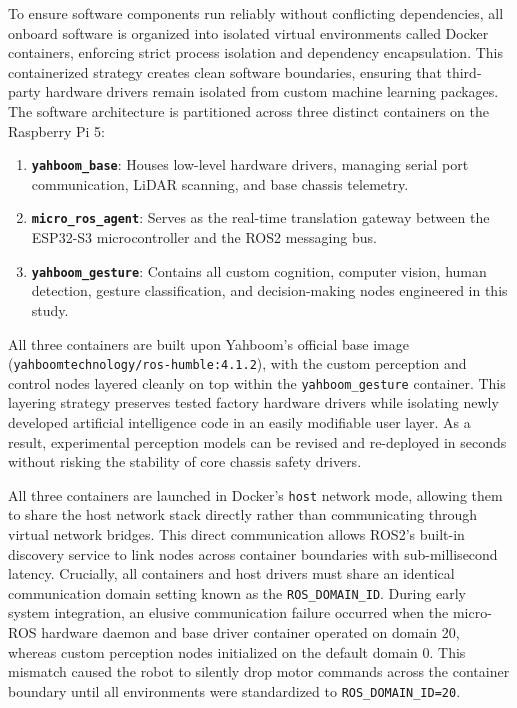 To ensure software components run reliably without conflicting dependencies, all onboard software is organized into isolated virtual environments called Docker containers, enforcing strict process isolation and dependency encapsulation. This containerized strategy creates clean software boundaries, ensuring that third-party hardware drivers remain isolated from custom machine learning packages. The software architecture is partitioned across three distinct containers on the Raspberry Pi 5:
\begin{enumerate}
    \item \textbf{\texttt{yahboom\_base}}: Houses low-level hardware drivers, managing serial port communication, LiDAR scanning, and base chassis telemetry.
    \item \textbf{\texttt{micro\_ros\_agent}}: Serves as the real-time translation gateway between the ESP32-S3 microcontroller and the ROS2 messaging bus.
    \item \textbf{\texttt{yahboom\_gesture}}: Contains all custom cognition, computer vision, human detection, gesture classification, and decision-making nodes engineered in this study.
\end{enumerate}

All three containers are built upon Yahboom's official base image (\texttt{yahboomtechnology/ros-humble:4.1.2}), with the custom perception and control nodes layered cleanly on top within the \texttt{yahboom\_gesture} container. This layering strategy preserves tested factory hardware drivers while isolating newly developed artificial intelligence code in an easily modifiable user layer. As a result, experimental perception models can be revised and re-deployed in seconds without risking the stability of core chassis safety drivers.

All three containers are launched in Docker's \texttt{host} network mode, allowing them to share the host network stack directly rather than communicating through virtual network bridges. This direct communication allows ROS2's built-in discovery service to link nodes across container boundaries with sub-millisecond latency. Crucially, all containers and host drivers must share an identical communication domain setting known as the \texttt{ROS\_DOMAIN\_ID}. During early system integration, an elusive communication failure occurred when the micro-ROS hardware daemon and base driver container operated on domain 20, whereas custom perception nodes initialized on the default domain 0. This mismatch caused the robot to silently drop motor commands across the container boundary until all environments were standardized to \texttt{ROS\_DOMAIN\_ID=20}.

